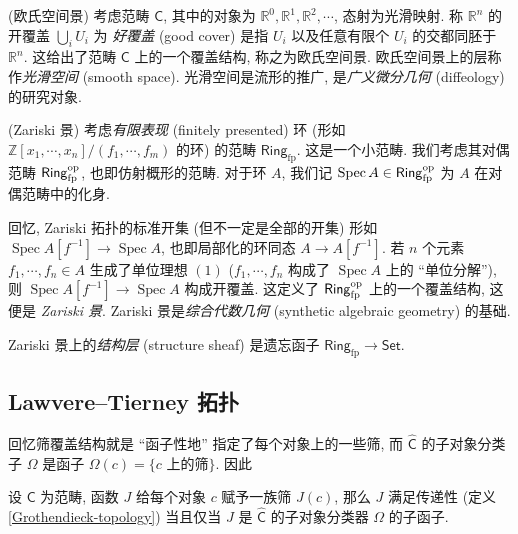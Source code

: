\begin{example}
    [label={cartsp-site}]
    {(欧氏空间景)}
    考虑范畴 $\mathsf C$, 其中的对象为 $\mathbb{R}^0,\mathbb{R}^1,\mathbb{R}^2,\cdots$,
    态射为光滑映射.
    称 $\mathbb{R}^n$ 的开覆盖 $\bigcup_i U_i$ 为 \emph{好覆盖} (good cover) 是指 $U_i$ 以及任意有限个 $U_i$ 的交都同胚于 $\mathbb{R}^n$.
    这给出了范畴 $\mathsf C$ 上的一个覆盖结构, 称之为欧氏空间景.
    欧氏空间景上的层称作\emph{光滑空间} (smooth space).
    光滑空间是流形的推广, 是\emph{广义微分几何} (diffeology) 的研究对象.
\end{example}

\begin{example}
    [label={zariski-site}]
    {(Zariski 景)}
    考虑\emph{有限表现} (finitely presented) 环 (形如 $\mathbb{Z}[x_1,\cdots,x_n]/(f_1,\cdots,f_m)$ 的环) 的范畴 $\mathsf {Ring}_{\text{fp}}$. 这是一个小范畴\footnotemark.
    我们考虑其对偶范畴 $\mathsf {Ring}_{\text{fp}}^{\text{op}}$, 也即仿射概形的范畴.
    对于环 $A$, 我们记 $\operatorname{Spec} A \in \mathsf {Ring}_{\text{fp}}^{\text{op}}$ 为 $A$ 在对偶范畴中的化身.

    回忆, Zariski 拓扑的标准开集 (但不一定是全部的开集) 形如 $\operatorname{Spec} A[f^{-1}] \to \operatorname{Spec}A$, 也即局部化的环同态 $A \to A[f^{-1}]$. 若 $n$ 个元素 $f_1,\cdots,f_n \in A$ 生成了单位理想 $(1)$ ($f_1,\cdots,f_n$ 构成了 $\operatorname{Spec}A$ 上的 ``单位分解''),
    则 $\operatorname{Spec}A[f^{-1}] \to \operatorname{Spec}A$ 构成开覆盖. 这定义了 $\mathsf {Ring}_{\text{fp}}^{\text{op}}$ 上的一个覆盖结构, 这便是 \emph{Zariski 景}.
    Zariski 景是\emph{综合代数几何} (synthetic algebraic geometry) 的基础.

    Zariski 景上的\emph{结构层} (structure sheaf) 是遗忘函子 $\mathsf{Ring}_{\text{fp}} \to \mathsf{Set}$.
\end{example}


\subsection{Lawvere--Tierney 拓扑}

回忆筛覆盖结构就是 ``函子性地'' 指定了每个对象上的一些筛, 而 $\widehat {\mathsf C}$ 的子对象分类子 $\Omega$ 是函子 $\Omega(c) = \{\text{$c$ 上的筛}\}$. 因此

\begin{prop}
	{}
	设 $\mathsf C$ 为范畴, 函数 $J$ 给每个对象 $c$ 赋予一族筛 $J(c)$, 那么 $J$ 满足传递性 (定义 \ref{Grothendieck-topology}) 当且仅当 $J$ 是 $\widehat {\mathsf C}$ 的子对象分类器 $\Omega$ 的子函子.
\end{prop}

